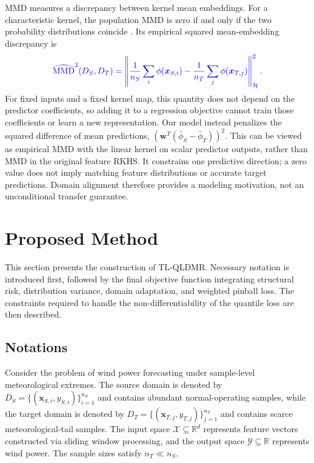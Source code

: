 \documentclass[a4paper]{cas-sc}
\begin{document}
{\color{blue}MMD measures a discrepancy between kernel mean embeddings. For a characteristic kernel, the population MMD is zero if and only if the two probability distributions coincide \citep{gretton2012kernel}. Its empirical squared mean-embedding discrepancy is}
\begin{equation}
\color{blue}
\widehat{\operatorname{MMD}}^2(D_S,D_T)=\left\|\frac{1}{n_S}\sum_i\phi(\boldsymbol{x}_{S,i})-\frac{1}{n_T}\sum_j\phi(\boldsymbol{x}_{T,j})\right\|_{\mathcal H}^2.
\end{equation}
{\color{blue}For fixed inputs and a fixed kernel map, this quantity does not depend on the predictor coefficients, so adding it to a regression objective cannot train those coefficients or learn a new representation. Our model instead penalizes the squared difference of mean predictions, $(\boldsymbol{w}^T(\bar\phi_S-\bar\phi_T))^2$. This can be viewed as empirical MMD with the linear kernel on scalar predictor outputs, rather than MMD in the original feature RKHS. It constrains one predictive direction; a zero value does not imply matching feature distributions or accurate target predictions. Domain alignment therefore provides a modeling motivation, not an unconditional transfer guarantee.}


\section{Proposed Method}\label{novel}
This section presents the construction of TL-QLDMR. Necessary notation is introduced first, followed by the final objective function integrating structural risk, distribution variance, domain adaptation, and weighted pinball loss. The constraints required to handle the non-differentiability of the quantile loss are then described.

\subsection{Notations}\label{not}
Consider the problem of wind power forecasting under {\color{blue}sample-level meteorological extremes}. The source domain is denoted by $D_{S} = \{(\boldsymbol{x}_{S,i}, y_{S,i})\}_{i=1}^{n_S}$ and contains abundant normal-operating samples, while the target domain is denoted by $D_{T} = \{(\boldsymbol{x}_{T,j}, y_{T,j})\}_{j=1}^{n_T}$ and contains scarce {\color{blue}meteorological-tail samples}. The input space $\mathcal{X} \subseteq \mathbb{R}^d$ represents feature vectors constructed via sliding window processing, and the output space $\mathcal{Y} \subseteq \mathbb{R}$ represents wind power. The sample sizes satisfy $n_T \ll n_S$.
\end{document}

